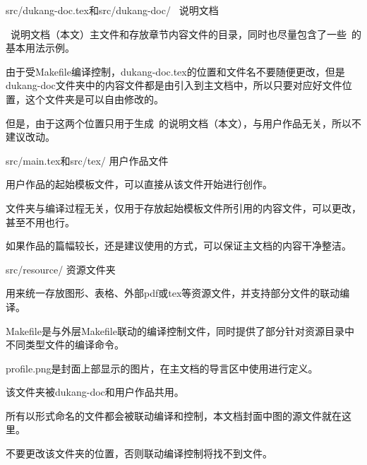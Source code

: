 \begin{cventries}
\cventry
  {src/dukang-doc.tex和src/dukang-doc/}
  {\dk~说明文档}
  {}
  {}
  {
    \begin{cvitems}
      \item {\dk~说明文档（本文）主文件和存放章节内容文件的目录，同时也尽量包含了一些\dk~的基本用法示例。}
      \item {由于受Makefile编译控制，dukang-doc.tex的位置和文件名不要随便更改，但是dukang-doc文件夹中的内容文件都是由引入到主文档中，所以只要对应好文件位置，这个文件夹是可以自由修改的。}
      \item {\color{awesome}但是，由于这两个位置只用于生成\dk~的说明文档（本文），与用户作品无关，所以不建议改动。}
    \end{cvitems}
  }
\cventry
  {src/main.tex和src/tex/}
  {用户作品文件}
  {}
  {}
  {
    \begin{cvitems}
      \item {用户作品的起始模板文件，可以直接从该文件开始进行创作。}
      \item {文件夹与编译过程无关，仅用于存放起始模板文件所引用的内容文件，可以更改，甚至不用也行。}
      \item {如果作品的篇幅较长，还是建议使用的方式，可以保证主文档的内容干净整洁。}
    \end{cvitems}
  }
\cventry
  {src/resource/}
  {资源文件夹}
  {}
  {}
  {
    \begin{cvitems}
      \item {用来统一存放图形、表格、外部pdf或tex等资源文件，并支持部分文件的联动编译。}
      \item {Makefile是与外层Makefile联动的编译控制文件，同时提供了部分针对资源目录中不同类型文件的编译命令。}
      \item {profile.png是封面上部显示的图片，在主文档的导言区中使用进行定义。}
      \item {该文件夹被dukang-doc和用户作品共用。}
      \item {所有以形式命名的文件都会被联动编译和控制，本文档封面中图的源文件就在这里。}
      \item {\color{awesome}不要更改该文件夹的位置，否则联动编译控制将找不到文件。}
    \end{cvitems}
  }
\end{cventries}

\clearpage

